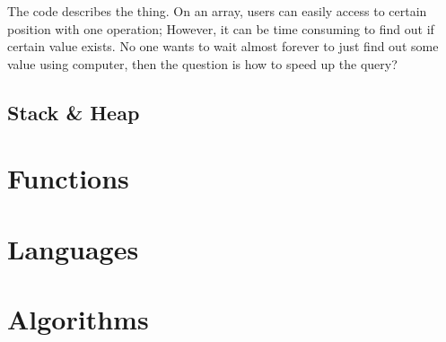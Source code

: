 The code describes the thing.
On an array,
users can easily access to certain position with one operation;
However,
it can be time consuming to find out if certain value exists.
No one wants to wait almost forever to just find out some value using computer,
then the question is how to speed up the query?

\subsection{Stack \& Heap}

\section{Functions}

\section{Languages}

\section{Algorithms}

